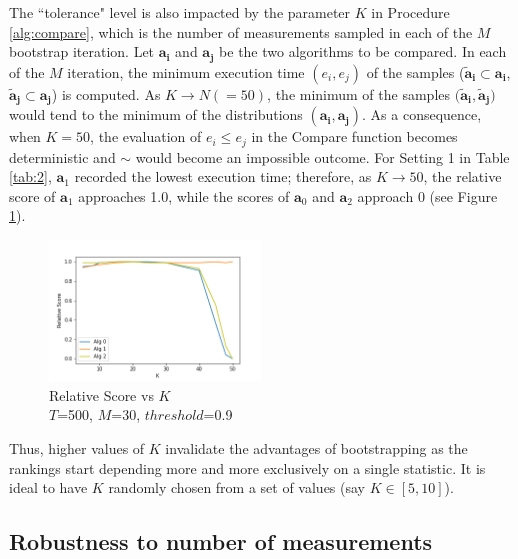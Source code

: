 \documentclass[conference]{IEEEtran}
\begin{document}
The ``tolerance" level is also impacted by the parameter $K$ in Procedure \ref{alg:compare}, which is the number of
measurements sampled in each of the $M$ bootstrap iteration. Let $\mathbf{a_i}$ and $\mathbf{a_j}$ be the two algorithms to be compared. In each of the $M$ iteration, the minimum execution time $(e_i,e_j)$ of
the samples ($\mathbf{\tilde{a}_i} \subset \mathbf{a_i}$, $\mathbf{\tilde{a}_j} \subset \mathbf{a_j}$) is computed. As
$K \to N (=50)$, the minimum of the samples $(\mathbf{\tilde{a}_i},\mathbf{\tilde{a}_j)}$ would tend to the minimum of the distributions $(\mathbf{a_i}, \mathbf{a_j})$. As a consequence, when $K=50$, the evaluation of $e_i \le e_j$ in the Compare function becomes deterministic and $\sim$ would become an impossible outcome. For Setting 1 in Table \ref{tab:2}, $\mathbf{a}_1$ recorded the lowest execution time; therefore, as $K \to 50$, the relative score of $\mathbf{a}_1$ approaches 1.0, while the scores of $\mathbf{a}_0$ and $\mathbf{a}_2$ approach 0 (see Figure \ref{fig:k}). 
\begin{figure}[h!]
	\includegraphics[width=0.5\textwidth]{fig/k}
	\caption{Relative Score vs $K$ \\ $T$=500, $M$=30, $threshold$=0.9}
	\label{fig:k}     
\end{figure}
Thus, higher values of $K$ invalidate the advantages of bootstrapping as the rankings start depending more and more exclusively on a single statistic. It is ideal to have $K$ randomly chosen from a set of values (say $K \in [5,10]$).

\subsection{Robustness to number of measurements}
\end{document}
